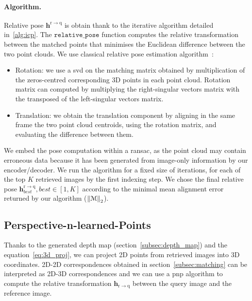 \paragraph{Algorithm.}
\label{para:pc_alignment}

Relative pose $\mathbf{h}^\mathrm{r \rightarrow q}$ is obtain thank to the iterative algorithm detailed in~\ref{alg:icp}. The $\mathtt{relative\_pose}$ function computes the relative transformation between the matched points that minimises the Euclidean difference between the two point clouds. We use classical relative pose estimation algorithm~\citep{Pomerleau2015}:  
\begin{itemize}
	\item Rotation: we use a \ac{svd} on the matching matrix obtained by multiplication of the zeros-centred corresponding 3D points in each point cloud. Rotation matrix can computed by multiplying the right-singular vectors matrix with the transposed of the left-singular vectors matrix.
	\item Translation: we obtain the translation component by aligning in the same frame the two point cloud centroids, using the rotation matrix, and evaluating the difference between them.
\end{itemize}

We embed the pose computation within a \ac{ransac}, as the point cloud may contain erroneous data because it has been generated from image-only information by our encoder/decoder. We run the algorithm for a fixed size of iterations, for each of the top $K$ retrieved images by the first indexing step. We chose the final relative pose $\mathbf{h}^\mathrm{r \rightarrow q}_{best}, best\in\left[1,K\right]$ according to the minimal mean alignment error returned by our algorithm ($\left\lVert\mathcal{M}\right\rVert_2$).

\subsection{Perspective-n-learned-Points}

\label{subsec:pnlp}
Thanks to the generated depth map (section~\ref{subsec:depth_map}) and the equation~\ref{eq:3d_proj}, we can project 2D points from retrieved images into 3D coordinates. 2D-2D correspondences obtained in section~\ref{subsec:matching} can be interpreted as 2D-3D correspondences and we can use a \ac{pnp} algorithm to compute the relative transformation $\mathbf{h}_\mathrm{r \rightarrow q}$ between the query image and the reference image. 

